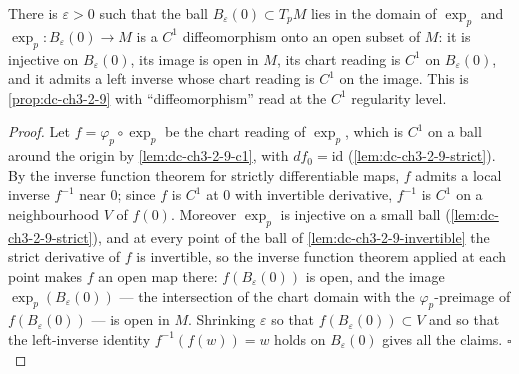 \begin{lemma}
  \label{lem:dc-ch3-2-9-c1diffeo}
  \leanok
  There is $\varepsilon > 0$ such that the ball
  $B_\varepsilon(0) \subset T_pM$ lies in the domain of $\exp_p$ and
  $\exp_p : B_\varepsilon(0) \to M$ is a $C^1$ diffeomorphism onto an open
  subset of $M$: it is injective on $B_\varepsilon(0)$, its image is open in
  $M$, its chart reading is $C^1$ on $B_\varepsilon(0)$, and it admits a left
  inverse whose chart reading is $C^1$ on the image. This is
  \cref{prop:dc-ch3-2-9} with ``diffeomorphism'' read at the $C^1$ regularity
  level.
\end{lemma}
\begin{proof}
  \leanok
  Let $f = \varphi_p \circ \exp_p$ be the chart reading of $\exp_p$, which is
  $C^1$ on a ball around the origin by \cref{lem:dc-ch3-2-9-c1}, with
  $df_0 = \mathrm{id}$ (\cref{lem:dc-ch3-2-9-strict}). By the inverse function
  theorem for strictly differentiable maps, $f$ admits a local inverse
  $f^{-1}$ near $0$; since $f$ is $C^1$ at $0$ with invertible derivative,
  $f^{-1}$ is $C^1$ on a neighbourhood $V$ of $f(0)$. Moreover $\exp_p$ is
  injective on a small ball (\cref{lem:dc-ch3-2-9-strict}), and at every point
  of the ball of \cref{lem:dc-ch3-2-9-invertible} the strict derivative of $f$
  is invertible, so the inverse function theorem applied at each point makes
  $f$ an open map there: $f(B_\varepsilon(0))$ is open, and the image
  $\exp_p(B_\varepsilon(0))$ — the intersection of the chart domain with the
  $\varphi_p$-preimage of $f(B_\varepsilon(0))$ — is open in $M$. Shrinking
  $\varepsilon$ so that $f(B_\varepsilon(0)) \subset V$ and so that the
  left-inverse identity $f^{-1}(f(w)) = w$ holds on $B_\varepsilon(0)$ gives
  all the claims. $\square$
\end{proof}

